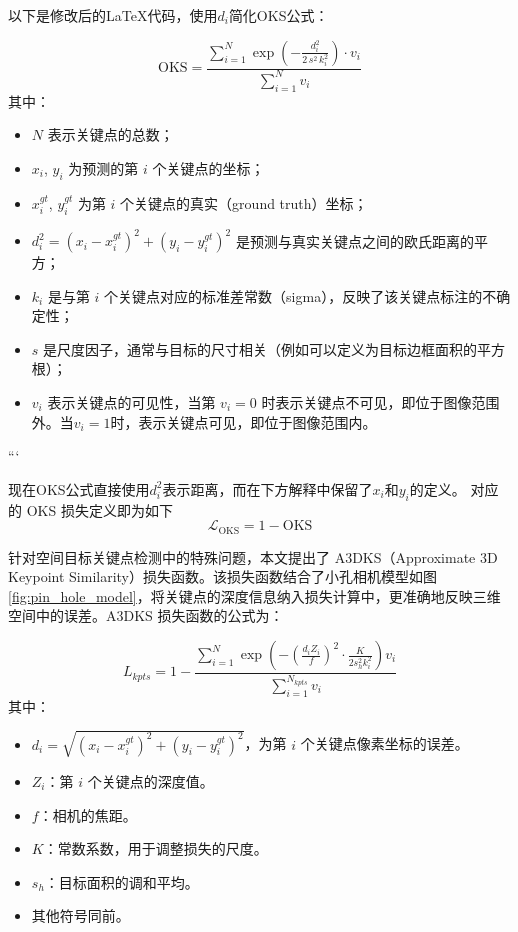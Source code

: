 以下是修改后的LaTeX代码，使用$d_i$简化OKS公式：


\begin{equation}
	\mathrm{OKS} = \frac{\sum\limits_{i=1}^{N} \exp\left(-\frac{d_i^2}{2\, s^2 \, k_i^2}\right) \cdot v_i}
	{\sum_{i=1}^{N} v_i}
\end{equation}
其中：
\begin{itemize}
	\item $N$ 表示关键点的总数；
	\item $x_i$, $y_i$ 为预测的第 $i$ 个关键点的坐标；
	\item $x_i^{gt}$, $y_i^{gt}$ 为第 $i$ 个关键点的真实（ground truth）坐标；
	\item $d_i^2 = (x_i - x_i^{gt})^2 + (y_i - y_i^{gt})^2$ 是预测与真实关键点之间的欧氏距离的平方；
	\item $k_i$ 是与第 $i$ 个关键点对应的标准差常数（sigma），反映了该关键点标注的不确定性；
	\item $s$ 是尺度因子，通常与目标的尺寸相关（例如可以定义为目标边框面积的平方根）；
	\item $v_i$ 表示关键点的可见性，当第 $v_i=0$ 时表示关键点不可见，即位于图像范围外。当$v_i=1$时，表示关键点可见，即位于图像范围内。 
\end{itemize}
```

现在OKS公式直接使用$d_i^2$表示距离，而在下方解释中保留了$x_i$和$y_i$的定义。
对应的 OKS 损失定义即为如下
\begin{equation}
	\mathcal{L}_{\text{OKS}} = 1 - \mathrm{OKS}
\end{equation}


针对空间目标关键点检测中的特殊问题，本文提出了 A3DKS（Approximate 3D Keypoint Similarity）损失函数。该损失函数结合了小孔相机模型如图\ref{fig:pin_hole_model}，将关键点的深度信息纳入损失计算中，更准确地反映三维空间中的误差。A3DKS 损失函数的公式为：

\begin{equation}
	L_{kpts} = 1 - \frac{\sum\limits_{i=1}^{N} \exp \left( -\left( \frac{d_i Z_i}{f} \right)^2 \cdot \frac{K}{2 s_h^2 k_i^2} \right) v_i}{\sum\limits_{i=1}^{N_{kpts}} v_i}
\end{equation}
其中：

\begin{itemize}
	\item $d_i = \sqrt{(x_i - x_i^{gt})^2 + (y_i - y_i^{gt})^2}$，为第 $i$ 个关键点像素坐标的误差。
	\item $Z_i$：第 $i$ 个关键点的深度值。
	\item $f$：相机的焦距。
	\item $K$：常数系数，用于调整损失的尺度。
	\item $s_h$：目标面积的调和平均。
	\item 其他符号同前。
\end{itemize}

